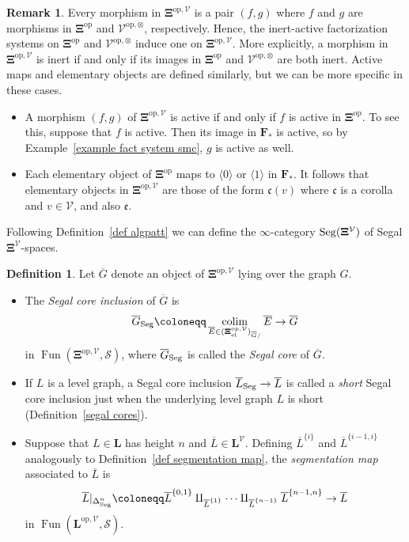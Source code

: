\documentclass{amsart}
\numberwithin{theorem}{subsection}
\theoremstyle{definition}
\newtheorem{definition}[theorem]{Definition}
\newtheorem{remark}[theorem]{Remark}
\providecommand{\op}{\mathrm{op}}
\providecommand{\xel}{\mathrm{el}}
\newcommand{\xFun}{\operatorname{Fun}}
\DeclareMathOperator*{\colim}{colim}
\newcommand{\finsetskel}{\mathbf{F}}
\newcommand{\pfinsetskel}{\finsetskel_*}
\newcommand{\xS}{\mathcal{S}}
\newcommand{\xV}{\mathcal{V}}
\newcommand{\xfe}{\mathfrak{e}}
\newcommand{\xfc}{\mathfrak{c}}
\newcommand{\name}[1]{\ensuremath{\text{\textup{#1}}}}
\newcommand{\levelg}{\mathbf{L}}
\newcommand{\levelV}{\levelg^\xV}
\newcommand{\gc}{\mathbf{\Xi}}
\newcommand{\gcV}{\gc^{\xV}}
\newcommand{\opgcV}{\gc^{\op,\xV}}
\newcommand{\Seg}{\name{Seg}}
\begin{document}
\begin{remark}\label{rem gcalgpatt}
Every morphism in $\gc^{\op, \xV}$ is a pair $(f,g)$ where $f$ and $g$ are morphisms in $\gc^\op$ and $\xV^{\op,\otimes}$, respectively. 
Hence, the inert-active factorization systems on $\gc^\op$ and $\xV^{\op,\otimes}$ induce one on $\gc^{\op, \xV}$. 
More explicitly, a morphism in $\gc^{\op, \xV}$ is inert if and only if its images in $\gc^\op$ and $\xV^{\op,\otimes}$ are both inert. 
Active maps and elementary objects are defined similarly, but we can be more specific in these cases.
\begin{itemize}
\item 
A morphism $(f,g)$ of $\gc^{\op, \xV}$ is active if and only if $f$ is active in $\gc^\op$.
To see this, suppose that $f$ is active. 
Then its image in $\pfinsetskel$ is active, so by Example~\ref{example fact system smc}, $g$ is active as well. 
\item
Each elementary object of $\gc^\op$ maps to $\langle 0\rangle$ or $\langle 1 \rangle$ in $\pfinsetskel$.
It follows that elementary objects in $\gc^{\op, \xV}$ are those of the form $\xfc(v)$ where $\xfc$ is a corolla and $v\in \xV$, and also $\xfe$.
\end{itemize}
Following Definition~\ref{def algpatt} we can define the $\infty$-category $\Seg(\gcV)$ of Segal $\gcV$-spaces. 
\end{remark}

\begin{definition}\label{def bar Segal cores}
Let  $\overline G$ denote an object of ${\opgcV}$ lying over the graph $G$.
\begin{itemize}
\item The \emph{Segal core inclusion} of $\overline G$ is 
\[
	\overline G_{\Seg} \coloneqq \colim_{\overline E\in (\opgcV_{\xel})_{\overline G/}} \overline E\to \overline G
\]
in $\xFun(\opgcV,\xS)$,
where $\overline G_{\Seg}$ is called the \emph{Segal core} of $\overline G$.
\item If $L$ is a level graph, a Segal core inclusion $\overline L_{\Seg} \to \overline L$ is called a \emph{short} Segal core inclusion just when the underlying level graph $L$ is short (Definition~\ref{segal cores}).
\item Suppose that $L \in \levelg$ has height $n$ and $\overline L \in \levelV$.
Defining $\overline L^{\{i\}}$ and $\overline L^{\{i-1,i\}}$ analogously to Definition~\ref{def segmentation map}, the \emph{segmentation map} associated to $\overline L$ is
\[
\overline L|_{\Delta^n_{\Seg}} \coloneqq \overline L^{\{0,1\}} \amalg_{\overline L^{\{1\}}}  \cdots
\amalg_{\overline L^{\{n-1\}}} \overline L^{\{n-1,n\}} \to \overline L
\]
in $\xFun(\levelg^{\op,\xV},\xS)$.
\end{itemize}
\end{definition}
\end{document}

